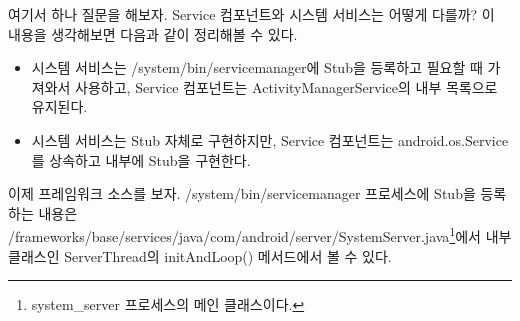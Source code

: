여기서 하나 질문을 해보자. Service 컴포넌트와 시스템 서비스는 어떻게 다를까?
이 내용을 생각해보면 다음과 같이 정리해볼 수 있다.
\begin{itemize}
\item 시스템 서비스는 /system/bin/servicemanager에 Stub을 등록하고 필요할 때 가져와서 사용하고, Service 컴포넌트는 ActivityManagerService의 내부 목록으로 유지된다.
\item 시스템 서비스는 Stub 자체로 구현하지만, Service 컴포넌트는 android.os.Service를 상속하고 내부에 Stub을 구현한다.
\end{itemize}

이제 프레임워크 소스를 보자.
/system/bin/servicemanager 프로세스에 Stub을 등록하는 내용은 /frameworks/base/services/java/com/android/server/SystemServer.java\footnote{system\_server 프로세스의 메인 클래스이다.}에서 내부 클래스인 ServerThread의 initAndLoop() 메서드에서 볼 수 있다.

